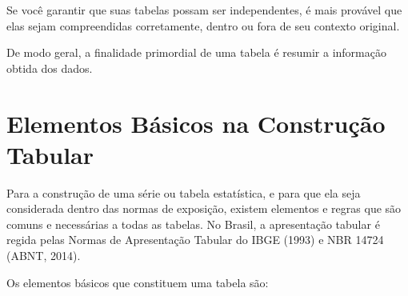 Se você garantir que suas tabelas possam ser independentes, é mais provável que elas sejam compreendidas corretamente, dentro ou fora de seu contexto original.\vskip0.3cm

De modo geral, a finalidade primordial de uma tabela é resumir a informação obtida dos dados.

\section{Elementos Básicos na Construção Tabular}

Para a construção de uma série ou tabela estatística, e para que ela seja considerada dentro das normas de exposição, existem elementos e regras que são comuns e necessárias a todas as tabelas. No Brasil, a apresentação tabular é regida pelas Normas de Apresentação Tabular do IBGE (1993) e NBR 14724 (ABNT, 2014).\vskip0.3cm


Os elementos básicos que constituem uma tabela são:

